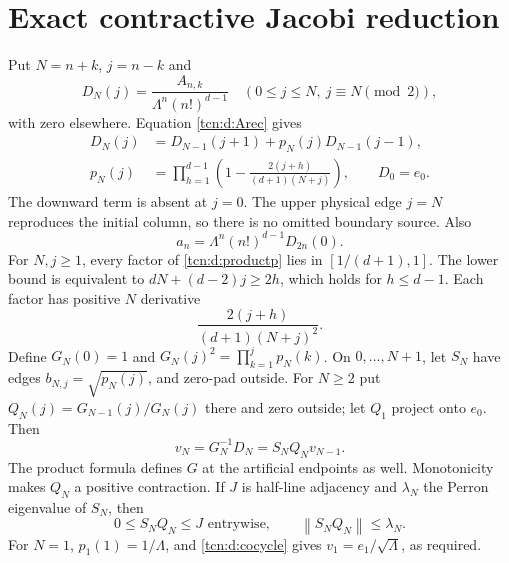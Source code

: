 \documentclass[11pt,letterpaper]{article}
\newcommand{\norm}[1]{\left\lVert#1\right\rVert}
\theoremstyle{remark}
\begin{document}
\section{Exact contractive Jacobi reduction}\label{tcn:d:sec:jacobi}
Put $N=n+k$, $j=n-k$ and
\[
 D_N(j)=\frac{A_{n,k}}{\Lambda^n(n!)^{d-1}}
 \quad(0\le j\le N,\ j\equiv N\pmod2),
\]
with zero elsewhere. Equation \eqref{tcn:d:Arec} gives
\begin{align}
 D_N(j)&=D_{N-1}(j+1)+p_N(j)D_{N-1}(j-1),\label{tcn:d:Drec}\\
 p_N(j)&=\prod_{h=1}^{d-1}
       \left(1-\frac{2(j+h)}{(d+1)(N+j)}\right),\qquad D_0=e_0.
 \label{tcn:d:productp}
\end{align}
The downward term is absent at $j=0$. The upper physical edge $j=N$ reproduces the initial column, so there is no omitted boundary source. Also
\begin{equation}\label{tcn:d:recover}
 a_n=\Lambda^n(n!)^{d-1}D_{2n}(0).
\end{equation}
For $N,j\ge1$, every factor of \eqref{tcn:d:productp} lies in $[1/(d+1),1]$. The lower bound is equivalent to $dN+(d-2)j\ge2h$, which holds for $h\le d-1$. Each factor has positive $N$ derivative
\[
 \frac{2(j+h)}{(d+1)(N+j)^2}.
\]
Define $G_N(0)=1$ and $G_N(j)^2=\prod_{k=1}^j p_N(k)$. On $0,\ldots,N+1$, let $S_N$ have edges $b_{N,j}=\sqrt{p_N(j)}$, and zero-pad outside. For $N\ge2$ put $Q_N(j)=G_{N-1}(j)/G_N(j)$ there and zero outside; let $Q_1$ project onto $e_0$. Then
\begin{equation}\label{tcn:d:cocycle}
 v_N=G_N^{-1}D_N=S_NQ_Nv_{N-1}.
\end{equation}
The product formula defines $G$ at the artificial endpoints as well. Monotonicity makes $Q_N$ a positive contraction. If $J$ is half-line adjacency and $\lambda_N$ the Perron eigenvalue of $S_N$, then
\begin{equation}\label{tcn:d:dom}
 0\le S_NQ_N\le J\text{ entrywise},\qquad
 \norm{S_NQ_N}\le\lambda_N.
\end{equation}
For $N=1$, $p_1(1)=1/\Lambda$, and \eqref{tcn:d:cocycle} gives $v_1=e_1/\sqrt\Lambda$, as required.
\end{document}
